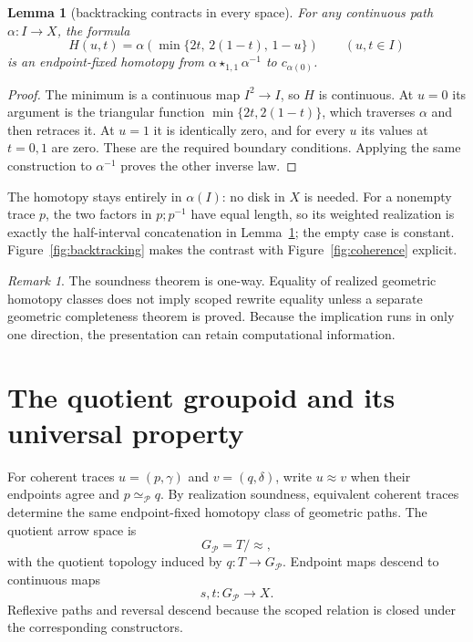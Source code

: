 \documentclass[10pt,reqno]{amsart}
\theoremstyle{definition}
\theoremstyle{plain}
\newtheorem{lemma}[definition]{Lemma}
\theoremstyle{remark}
\newtheorem{remark}[definition]{Remark}
\newcommand{\RwEq}{\mathrel{\simeq_{\!\mathcal P}}}
\begin{document}
\begin{lemma}[backtracking contracts in every space]
\label{lem:backtracking}
For any continuous path $\alpha:I\to X$, the formula
\[
 H(u,t)=\alpha\!\left(\min\{2t,\,2(1-t),\,1-u\}\right)
 \qquad (u,t\in I)
\]
is an endpoint-fixed homotopy from
$\alpha\star_{1,1}\alpha^{-1}$ to $c_{\alpha(0)}$.
\end{lemma}
\begin{proof}
The minimum is a continuous map $I^2\to I$, so $H$ is continuous.
At $u=0$ its argument is the triangular function
$\min\{2t,2(1-t)\}$, which traverses $\alpha$ and then retraces it.
At $u=1$ it is identically zero, and for every $u$ its values at
$t=0,1$ are zero.  These are the required boundary conditions.
Applying the same construction to $\alpha^{-1}$ proves the other inverse law.
\end{proof}

The homotopy stays entirely in $\alpha(I)$: no disk in $X$ is needed.
For a nonempty trace $p$, the two factors in $p;p^{-1}$ have equal length,
so its weighted realization is exactly the half-interval concatenation
in Lemma~\ref{lem:backtracking}; the empty case is constant.
Figure~\ref{fig:backtracking} makes the contrast with
Figure~\ref{fig:coherence} explicit.


\begin{remark}
The soundness theorem is one-way.  Equality of realized geometric homotopy
classes does not imply scoped rewrite equality unless a separate geometric
completeness theorem is proved.  Because the implication runs in only one
direction, the presentation can retain computational information.
\end{remark}

\section{The quotient groupoid and its universal property}
\label{sec:quotient}

For coherent traces $u=(p,\gamma)$ and $v=(q,\delta)$, write
$u\approx v$ when their endpoints agree and $p\RwEq q$.  By realization
soundness, equivalent coherent traces determine the same endpoint-fixed
homotopy class of geometric paths.  The quotient arrow space is
\[
  G_{\mathcal P}=T/{\approx},
\]
with the quotient topology induced by $q:T\to G_{\mathcal P}$.  Endpoint
maps descend to continuous maps
\[
  s,t:G_{\mathcal P}\longrightarrow X.
\]
Reflexive paths and reversal descend because the scoped relation is closed
under the corresponding constructors.
\end{document}
